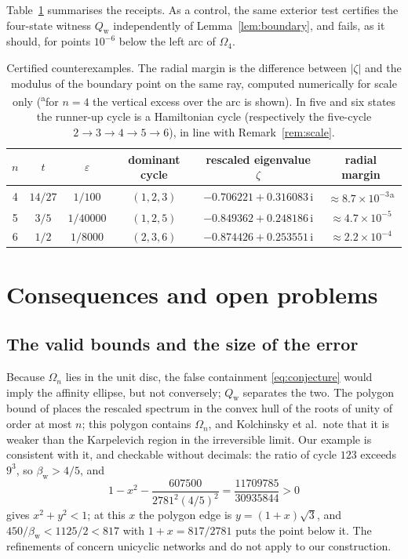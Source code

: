 \documentclass[11pt,a4paper]{article}
\numberwithin{equation}{section}
\theoremstyle{definition}
\theoremstyle{remark}
\newcommand{\ii}{\mathrm{i}}
\newcommand{\Om}{\Omega}
\newcommand{\eps}{\varepsilon}
\newcommand{\Qw}{Q_{\mathrm{w}}}
\newcommand{\bw}{\beta_{\mathrm{w}}}
\begin{document}
Table~\ref{tab:certified} summarises the receipts. As a control, the
same exterior test certifies the four-state witness \(\Qw\)
independently of Lemma~\ref{lem:boundary}, and fails, as it should,
for points \(10^{-6}\) below the left arc of \(\Om_4\).

\begin{table}[htbp]
\centering
\small
\begin{tabular}{@{}cccccc@{}}
\toprule
\(n\) & \(t\) & \(\eps\) & dominant cycle & rescaled eigenvalue \(\zeta\) & radial margin\\
\midrule
4 & \(14/27\) & \(1/100\) & \((1,2,3)\) & \(-0.706221+0.316083\,\ii\) & \(\approx8.7\times10^{-3}\)\textsuperscript{a}\\
5 & \(3/5\) & \(1/40000\) & \((1,2,5)\) & \(-0.849362+0.248186\,\ii\) & \(\approx4.7\times10^{-5}\)\\
6 & \(1/2\) & \(1/8000\) & \((2,3,6)\) & \(-0.874426+0.253551\,\ii\) & \(\approx2.2\times10^{-4}\)\\
\bottomrule
\end{tabular}
\caption{Certified counterexamples. The radial margin is the
difference between \(|\zeta|\) and the modulus of the boundary point on
the same ray, computed numerically for scale only (\textsuperscript{a}for \(n=4\) the vertical excess over the arc is shown). In five and six
states the runner-up cycle is a Hamiltonian cycle (respectively the
five-cycle \(2\to3\to4\to5\to6\)), in line with
Remark~\ref{rem:scale}.}
\label{tab:certified}
\end{table}

\section{Consequences and open problems}
\label{sec:discussion}

\subsection{The valid bounds and the size of the error}

Because \(\Om_n\) lies in the unit disc, the false containment
\eqref{eq:conjecture} would imply the affinity ellipse, but not
conversely; \(\Qw\) separates the two. The polygon bound of
\cite[Theorem~5]{kolchinsky2026} places the rescaled spectrum in the
convex hull of the roots of unity of order at most \(n\); this polygon
contains \(\Om_n\), and Kolchinsky et al.\ note that it is weaker than
the Karpelevich region in the irreversible limit. Our example is
consistent with it, and checkable without decimals: the ratio of cycle
\(123\) exceeds \(9^3\), so \(\bw>4/5\), and
\[
1-x^2-\frac{607500}{2781^2(4/5)^2}=\frac{11709785}{30935844}>0
\]
gives \(x^2+y^2<1\); at this \(x\) the polygon edge is
\(y=(1+x)\sqrt3\), and \(450/\bw<1125/2<817\) with \(1+x=817/2781\)
puts the point below it. The refinements of \cite{xu2026} concern
unicyclic networks and do not apply to our construction.
\end{document}
